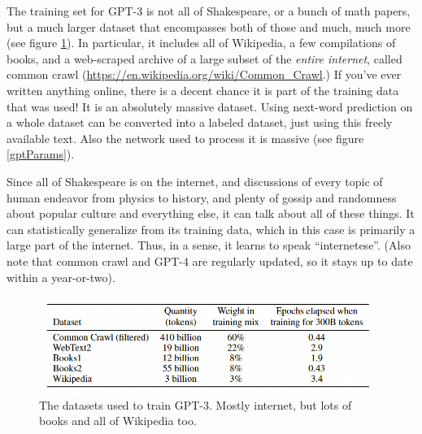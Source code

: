 The training set for GPT-3 is not all of Shakespeare, or a bunch of math papers, but a much larger dataset that encompasses both of those and much, much more (see figure \ref{gptDatasets}).  In particular, it includes all of Wikipedia, a few compilations of books, and a web-scraped archive of a large subset of the \emph{entire internet}, called common crawl (\url{https://en.wikipedia.org/wiki/Common_Crawl}.) If you've ever written anything online, there is a decent chance it is part of the training data that was used! It is an absolutely massive dataset. Using next-word prediction on a whole dataset can be converted into a labeled dataset, just using this freely available text.  Also the network used to process it is massive (see figure \ref{gptParams}). 

Since all of Shakespeare is on the internet, and discussions of every topic of human endeavor from physics to history, and plenty of gossip and randomness about popular culture and everything else, it can talk about all of these things.  It can statistically generalize from its training data, which in this case is primarily a large part of the internet. Thus, in a sense, it learns to speak ``internetese''.  (Also note that common crawl and GPT-4 are regularly updated, so it stays up to date within a year-or-two). 

\begin{figure}[h]
\centering
\includegraphics[scale=.4]{./images/gptDatasets}
\caption[GPT Technical report. Todo]{The datasets used to train GPT-3. Mostly internet, but lots of books and all of Wikipedia too. }
\label{gptDatasets}
\end{figure}

